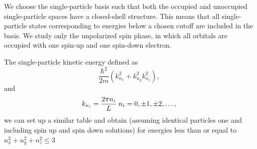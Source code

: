 We choose  the single-particle basis such that both the occupied and 
unoccupied single-particle spaces have a closed-shell 
structure. This means that all single-particle states 
corresponding to energies below a chosen cutoff are
included in the basis. We study only the unpolarized spin
phase, in which all orbitals are occupied with one spin-up 
and one spin-down electron. 


The single-particle kinetic energy defined as
\[
\frac{\hbar^2}{2m}\left(k_{n_x}^2+k_{n_y}^2k_{n_z}^2\right),
\]
and 
\[
k_{n_i}=\frac{2\pi n_i}{L} \hspace{0.1cm} n_i = 0, \pm 1, \pm 2, \dots, 
\]
we can set up a similar table and obtain (assuming identical particles one and including spin up and spin down solutions)  for energies less than or equal to $n_{x}^{2}+n_{y}^{2}+n_{z}^{2}\le 3$



